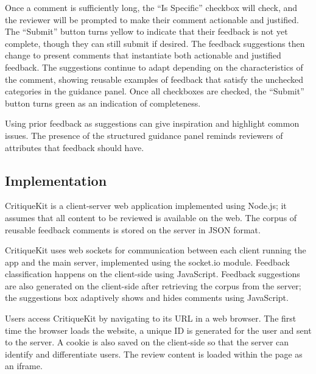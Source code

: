 Once a comment is sufficiently long, the ``Is Specific'' checkbox will check, and the reviewer will be prompted to make their comment actionable and justified. The ``Submit'' button turns yellow to indicate that their feedback is not yet complete, though they can still submit if desired. The feedback suggestions then change to present comments that instantiate both actionable and justified feedback. The suggestions continue to adapt depending on the characteristics of the comment, showing reusable examples of feedback that satisfy the unchecked categories in the guidance panel. Once all checkboxes are checked, the ``Submit'' button turns green as an indication of completeness. 

Using prior feedback as suggestions can give inspiration and highlight common issues. The presence of the structured guidance panel reminds reviewers of attributes that feedback should have. 

\subsection{Implementation}
CritiqueKit is a client-server web application implemented using Node.js; it assumes that all content to be reviewed is available on the web. The corpus of reusable feedback comments is stored on the server in JSON format.

CritiqueKit uses web sockets for communication between each client running the app and the main server, implemented using the socket.io module. Feedback classification happens on the client-side using JavaScript. Feedback suggestions are also generated on the client-side after retrieving the corpus from the server; the suggestions box adaptively shows and hides comments using JavaScript. 

Users access CritiqueKit by navigating to its URL in a web browser. The first time the browser loads the website, a unique ID is generated for the user and sent to the server. A cookie is also saved on the client-side so that the server can identify and differentiate users. The review content is loaded within the page as an iframe.
